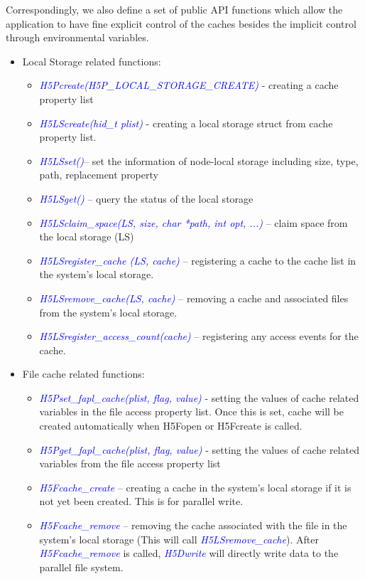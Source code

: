 \documentclass[aps, prb, 11pt, notitlepage]{revtex4-1}
\def\function#1{\textcolor{blue}{{\it #1}}}
\begin{document}
Correspondingly, we also define a set of public API functions which allow the application to have fine explicit control of the caches besides the implicit control through environmental variables. 
\begin{itemize} \item Local Storage related functions: 
\begin{itemize}
\item \function {H5Pcreate(H5P\_LOCAL\_STORAGE\_CREATE)} - creating a cache property list
\item \function{H5LScreate(hid\_t plist)} - creating a local storage struct from cache property list.
\item \function{H5LSset()}-- set the information of node-local storage including size, type, path, replacement property
\item \function{H5LSget()} -- query the status of the local storage
\item \function{H5LSclaim\_space(LS, size, char *path, int opt, ...)} -- claim space from the local storage (LS)
\item \function{H5LSregister\_cache (LS, cache)} -- registering a cache to the cache list in the system’s local storage.
\item \function{H5LSremove\_cache(LS, cache)} -- removing a cache and associated files from the system’s local storage.
\item \function{H5LSregister\_access\_count(cache)} -- registering any access events for the cache.
\end{itemize}
\item File cache related functions:
\begin{itemize}
\item \function{H5Pset\_fapl\_cache(plist, flag, value)} - setting the values of cache related variables in the file access property list. Once this is set, cache will be created automatically when H5Fopen or H5Fcreate is called.
\item \function{H5Pget\_fapl\_cache(plist, flag, value)} - setting the values of cache related variables from the file access property list
\item \function{H5Fcache\_create} -- creating a cache in the system’s local storage if it is not yet been created. This is for parallel write. 
\item \function{H5Fcache\_remove} -- removing the cache associated with the file in the system's local storage (This will call \function{H5LSremove\_cache}). After \function{H5Fcache\_remove} is called, \function{H5Dwrite} will directly write data to the parallel file system. 

\end{itemize}
\end{itemize}
\end{document}
